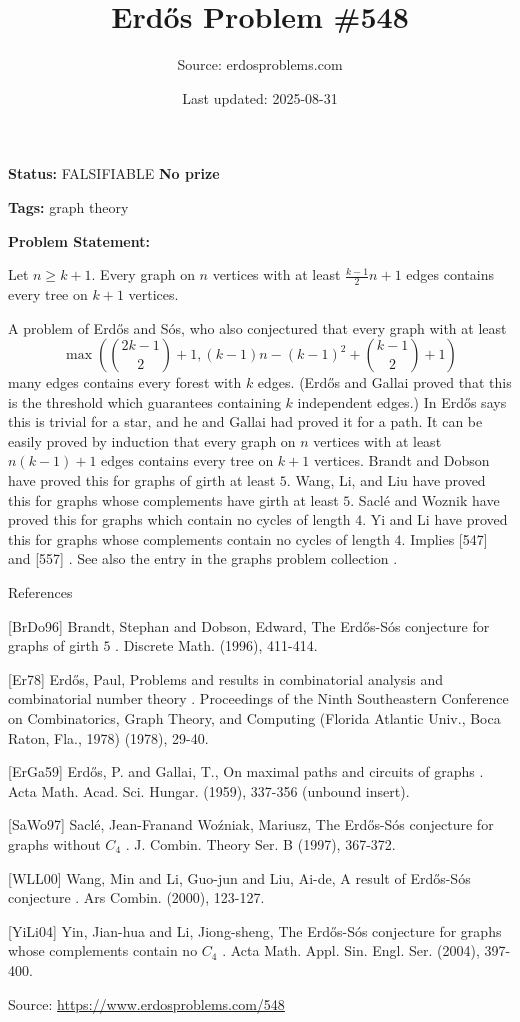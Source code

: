 \documentclass{article}
\title{Erd\H{o}s Problem \#548}
\date{Last updated: 2025-08-31}
\author{Source: erdosproblems.com}
\begin{document}
\maketitle

\noindent\textbf{Status:} FALSIFIABLE \quad \textbf{No prize}

\noindent\textbf{Tags:} graph theory

\medskip

\noindent\textbf{Problem Statement:}

Let $n\geq k+1$. Every graph on $n$ vertices with at least $\frac{k-1}{2}n+1$ edges contains every tree on $k+1$ vertices.




A problem of Erd\H{o}s and S\'{o}s, who also conjectured that every graph with at least\[\max\left( \binom{2k-1}{2}+1, (k-1)n-(k-1)^2+\binom{k-1}{2}+1\right)\]many edges contains every forest with $k$ edges. (Erd\H{o}s and Gallai \cite{ErGa59} proved that this is the threshold which guarantees containing $k$ independent edges.) In \cite{Er78} Erd\H{o}s says this is trivial for a star, and he and Gallai had proved it for a path. It can be easily proved by induction that every graph on $n$ vertices with at least $n(k-1)+1$ edges contains every tree on $k+1$ vertices. Brandt and Dobson \cite{BrDo96} have proved this for graphs of girth at least $5$. Wang, Li, and Liu \cite{WLL00} have proved this for graphs whose complements have girth at least $5$. Sacl\'{e} and Woznik \cite{SaWo97} have proved this for graphs which contain no cycles of length $4$. Yi and Li \cite{YiLi04} have proved this for graphs whose complements contain no cycles of length $4$. Implies [547] and [557] . See also the entry in the graphs problem collection .




References

[BrDo96] Brandt, Stephan and Dobson, Edward, The Erd\H{o}s-S\'{o}s conjecture for graphs of girth {$5$} . Discrete Math. (1996), 411-414.

[Er78] Erd\H{o}s, Paul, Problems and results in combinatorial analysis and combinatorial number theory . Proceedings of the Ninth Southeastern Conference on Combinatorics, Graph Theory, and Computing (Florida Atlantic Univ., Boca Raton, Fla., 1978) (1978), 29-40.

[ErGa59] Erd\H{o}s, P. and Gallai, T., On maximal paths and circuits of graphs . Acta Math. Acad. Sci. Hungar. (1959), 337-356 (unbound insert).

[SaWo97] Sacl\'{e}, Jean-Fran\cCois and Wo\'{z}niak, Mariusz, The Erd\H{o}s-S\'{o}s conjecture for graphs without {$C_4$} . J. Combin. Theory Ser. B (1997), 367-372.

[WLL00] Wang, Min and Li, Guo-jun and Liu, Ai-de, A result of Erd\H{o}s-S\'{o}s conjecture . Ars Combin. (2000), 123-127.

[YiLi04] Yin, Jian-hua and Li, Jiong-sheng, The Erd\H{o}s-S\'{o}s conjecture for graphs whose complements contain no {$C_4$} . Acta Math. Appl. Sin. Engl. Ser. (2004), 397-400.

\bigskip
\noindent\small{Source: \url{https://www.erdosproblems.com/548}}
\end{document}

